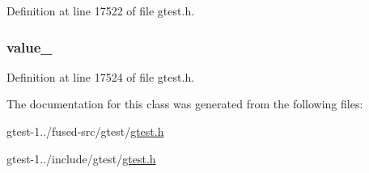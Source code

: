 \-Definition at line 17522 of file gtest.\-h.

\hypertarget{classtesting_1_1TestProperty_a52b34cd6a1fa46f2a98c0147ef7d050e}{
\subsubsection[{value\-\_\-}]{ {\bf value\-\_\-}}}\label{dd/dde/classtesting_1_1TestProperty_a52b34cd6a1fa46f2a98c0147ef7d050e}


\-Definition at line 17524 of file gtest.\-h.



\-The documentation for this class was generated from the following files\-:\begin{DoxyCompactItemize}
\item 
gtest-\/1../fused-\/src/gtest/\hyperlink{fused-src_2gtest_2gtest_8h}{gtest.\-h}\item 
gtest-\/1../include/gtest/\hyperlink{include_2gtest_2gtest_8h}{gtest.\-h}\end{DoxyCompactItemize}
